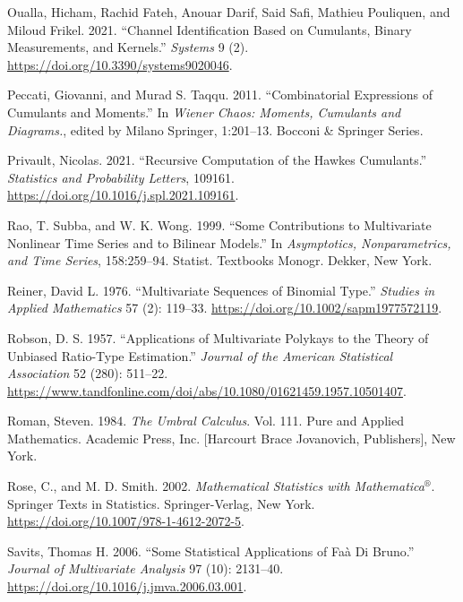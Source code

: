\begin{CSLReferences}{1}{0}
\leavevmode{}%
Oualla, Hicham, Rachid Fateh, Anouar Darif, Said Safi, Mathieu Pouliquen, and Miloud Frikel. 2021. {``Channel Identification Based on Cumulants, Binary Measurements, and Kernels.''} \emph{Systems} 9 (2). \url{https://doi.org/10.3390/systems9020046}.

\leavevmode{}%
Peccati, Giovanni, and Murad S. Taqqu. 2011. {``Combinatorial Expressions of Cumulants and Moments.''} In \emph{Wiener Chaos: Moments, Cumulants and Diagrams.}, edited by Milano Springer, 1:201--13. Bocconi \& Springer Series.

\leavevmode{}%
Privault, Nicolas. 2021. {``Recursive Computation of the Hawkes Cumulants.''} \emph{Statistics and Probability Letters}, 109161. \url{https://doi.org/10.1016/j.spl.2021.109161}.

\leavevmode{}%
Rao, T. Subba, and W. K. Wong. 1999. {``Some Contributions to Multivariate Nonlinear Time Series and to Bilinear Models.''} In \emph{Asymptotics, Nonparametrics, and Time Series}, 158:259--94. Statist. Textbooks Monogr. Dekker, New York.

\leavevmode{}%
Reiner, David L. 1976. {``Multivariate Sequences of Binomial Type.''} \emph{Studies in Applied Mathematics} 57 (2): 119--33. \url{https://doi.org/10.1002/sapm1977572119}.

\leavevmode{}%
Robson, D. S. 1957. {``Applications of Multivariate Polykays to the Theory of Unbiased Ratio-Type Estimation.''} \emph{Journal of the American Statistical Association} 52 (280): 511--22. \url{https://www.tandfonline.com/doi/abs/10.1080/01621459.1957.10501407}.

\leavevmode{}%
Roman, Steven. 1984. \emph{The Umbral Calculus}. Vol. 111. Pure and Applied Mathematics. Academic Press, Inc. {[}Harcourt Brace Jovanovich, Publishers{]}, New York.

\leavevmode{}%
Rose, C., and M. D. Smith. 2002. \emph{Mathematical Statistics with {M}athematica{\(^\circledR\)}}. Springer Texts in Statistics. Springer-Verlag, New York. \url{https://doi.org/10.1007/978-1-4612-2072-5}.

\leavevmode{}%
Savits, Thomas H. 2006. {``Some Statistical Applications of Faà Di {B}runo.''} \emph{Journal of Multivariate Analysis} 97 (10): 2131--40. \url{https://doi.org/10.1016/j.jmva.2006.03.001}.


\end{CSLReferences}
